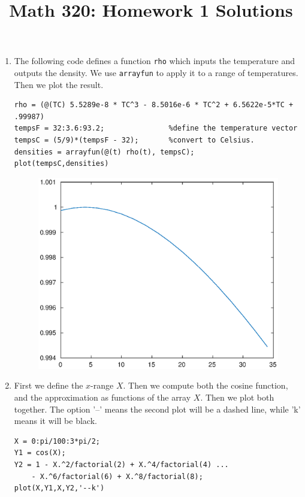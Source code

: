 \documentclass[12pt]{amsart}
\begin{document}
\title{Math 320: Homework 1 Solutions}
\maketitle

\begin{enumerate}
\item The following code defines a function {\tt rho} which inputs
the temperature and outputs the density. We use {\tt arrayfun}
to apply it to a range of temperatures. Then we plot the result.

\begin{verbatim}
rho = (@(TC) 5.5289e-8 * TC^3 - 8.5016e-6 * TC^2 + 6.5622e-5*TC + .99987)
tempsF = 32:3.6:93.2;               %define the temperature vector
tempsC = (5/9)*(tempsF - 32);       %convert to Celsius.
densities = arrayfun(@(t) rho(t), tempsC);
plot(tempsC,densities)
\end{verbatim}

\begin{figure}[h!]
\centering
\includegraphics[scale=1]{hw1p1.eps}
\end{figure}

\item First we define the $x$-range $X$. Then we compute both
the cosine function, and the approximation as functions of the array $X$.
Then we plot both together. The option '--' means the second plot
will be a dashed line, while 'k' means it will be black.

\pagebreak

\begin{verbatim}
X = 0:pi/100:3*pi/2;
Y1 = cos(X);
Y2 = 1 - X.^2/factorial(2) + X.^4/factorial(4) ...
    - X.^6/factorial(6) + X.^8/factorial(8);
plot(X,Y1,X,Y2,'--k')
\end{verbatim}


\end{enumerate}
\end{document}
